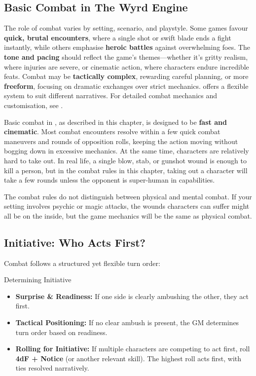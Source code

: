\begin{multicols}{2}

\section{Basic Combat in The Wyrd Engine}

The role of combat varies by setting, scenario, and playstyle. Some games favour \textbf{quick, brutal encounters}, where a single shot or swift blade ends a fight instantly, while others emphasise \textbf{heroic battles} against overwhelming foes. The \textbf{tone and pacing} should reflect the game's themes—whether it’s gritty realism, where injuries are severe, or cinematic action, where characters endure incredible feats. Combat may be \textbf{tactically complex}, rewarding careful planning, or more \textbf{freeform}, focusing on dramatic exchanges over strict mechanics. \wyrd offers a flexible system to suit different narratives. For detailed combat mechanics and customisation, see .

Basic combat in \wyrd, as described in this chapter, is designed to be \textbf{fast and cinematic}. Most combat encounters resolve within a few quick combat maneuvers and rounds of opposition rolls, keeping the action moving without bogging down in excessive mechanics. At the same time, characters are relatively hard to take out. In real life, a single blow, stab, or gunshot wound is enough to kill a person, but in the combat rules in this chapter, taking out a character will take a few rounds unless the opponent is super-human in capabilities.

The combat rules do not distinguish between physical and mental combat. If your setting involves psychic or magic attacks, the wounds characters can suffer might all be on the inside, but the game mechanics will be the same as physical combat.

\subsection{Initiative: Who Acts First?}

Combat follows a structured yet flexible turn order:

\begin{Example}{Determining Initiative}
	\begin{itemize}\raggedright
    	\item \textbf{Surprise \& Readiness:} If one side is clearly ambushing the other, they act first.
	    \item \textbf{Tactical Positioning:} If no clear ambush is present, the GM determines turn order based on readiness.
	    \item \textbf{Rolling for Initiative:} If multiple characters are competing to act first, roll \textbf{4dF + Notice} (or another relevant skill). The highest roll acts first, with ties resolved narratively.
	\end{itemize}
\end{Example}


\end{multicols}
